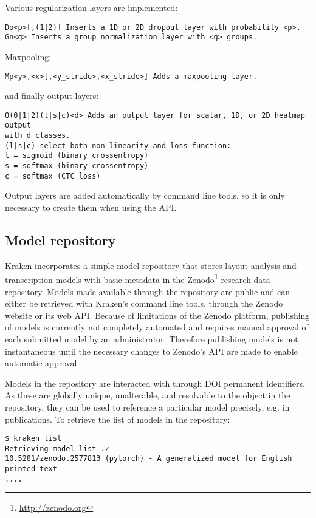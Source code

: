 Various regularization layers are implemented:

\begin{verbatim}
Do<p>[,(1|2)] Inserts a 1D or 2D dropout layer with probability <p>.
Gn<g> Inserts a group normalization layer with <g> groups.
\end{verbatim}

Maxpooling:

\begin{verbatim}
Mp<y>,<x>[,<y_stride>,<x_stride>] Adds a maxpooling layer.
\end{verbatim}

and finally output layers:

\begin{verbatim}
O(0|1|2)(l|s|c)<d> Adds an output layer for scalar, 1D, or 2D heatmap output
with d classes.
(l|s|c) select both non-linearity and loss function:
l = sigmoid (binary crossentropy)
s = softmax (binary crossentropy)
c = softmax (CTC loss)
\end{verbatim}

Output layers are added automatically by command line tools, so it is only
necessary to create them when using the API.

\subsection{Model repository}

Kraken incorporates a simple model repository that stores layout analysis and
transcription models with basic metadata in the
Zenodo\footnote{\url{http://zenodo.org}} research data repository. Models made
available through the repository are public and can either be retrieved with
Kraken's command line tools, through the Zenodo website or its web API. Because
of limitations of the Zenodo platform, publishing of models is currently not
completely automated and requires manual approval of each submitted model by an
administrator. Therefore publishing models is not instantaneous until the
necessary changes to Zenodo's API are made to enable automatic approval.

Models in the repository are interacted with through DOI permanent identifiers.
As these are globally unique, unalterable, and resolvable to the object in the
repository, they can be used to reference a particular model precisely, e.g. in
publications. To retrieve the list of models in the repository:

\begin{verbatim}
$ kraken list
Retrieving model list .✓
10.5281/zenodo.2577813 (pytorch) - A generalized model for English printed text
....
\end{verbatim}


